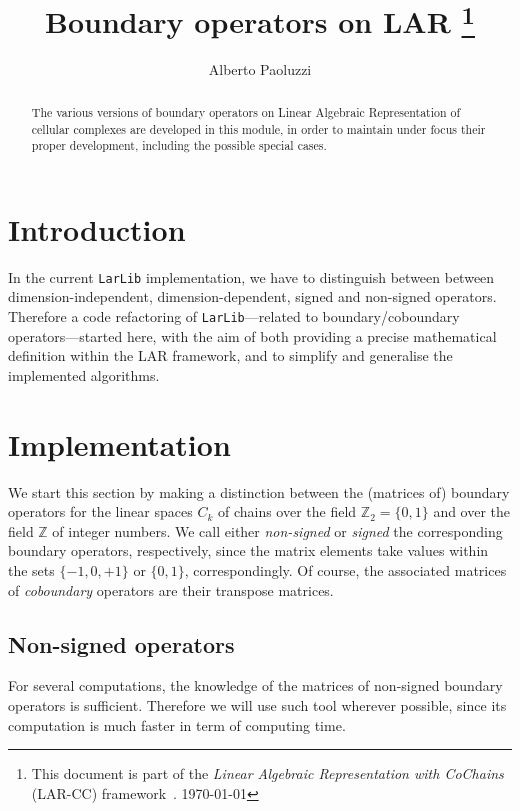 \documentclass[11pt,oneside]{article}	%
\title{Boundary operators on LAR
\footnote{This document is part of the \emph{Linear Algebraic Representation with CoChains} (LAR-CC) framework~\cite{cclar-proj:2013:00}. \today}
}
\author{Alberto Paoluzzi}
\def\Z{\mathbb{Z}}
\begin{document}
\maketitle
\nonstopmode

\begin{abstract}
The various versions of boundary operators on Linear Algebraic Representation of cellular complexes are  developed in this module, in order to maintain under focus their proper development, including the possible special cases.
\end{abstract}

\tableofcontents
\newpage

\section{Introduction}

In the current \texttt{LarLib} implementation, we have to distinguish between between dimension-independent, dimension-dependent, signed and non-signed operators.
Therefore a code refactoring of \texttt{LarLib}---related to boundary/coboundary operators---started here, with the aim of both providing a precise mathematical definition within the LAR framework, and to simplify and generalise the implemented algorithms.


\section{Implementation}

We start this section by making a distinction between the (matrices of) boundary operators for the linear spaces $C_k$ of chains over the field $\Z_2 = \{0,1\}$ and over the field $\Z$ of integer numbers.
We call either \emph{non-signed} or \emph{signed} the corresponding boundary operators, respectively, since the matrix elements take values within the sets $\{-1,0,+1\}$ or $\{0,1\}$, correspondingly.
Of course, the associated matrices of \emph{coboundary} operators are their transpose matrices.


\subsection{Non-signed operators}

For several computations, the knowledge of the matrices of non-signed boundary operators is sufficient. 
Therefore we will use such tool wherever possible, since its computation is much faster in term of computing time.
\end{document}
